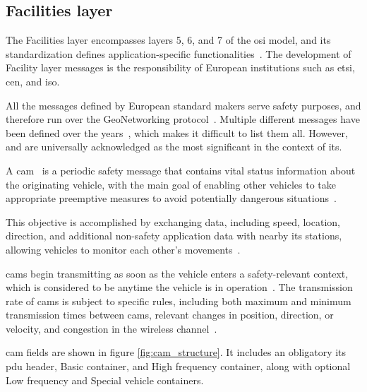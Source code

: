 \subsection[Facilities layer]{Facilities layer}
\label{subsec:Facilities}

The Facilities layer encompasses layers 5, 6, and 7 of the \gls{osi} model, and its standardization defines application-specific functionalities~\cite{festag_standards_2015}. The development of Facility layer messages is the responsibility of European institutions such as \gls{etsi}, \gls{cen}, and \gls{iso}.

All the messages defined by European standard makers serve safety purposes, and therefore run over the GeoNetworking protocol~\cite{festag_standards_2015}. Multiple different messages have been defined over the years~\cite{festag_cooperative_2014}, which makes it difficult to list them all. However,  and  are universally acknowledged as the most significant in the context of \gls{its}.

A \gls{cam}~\cite{etsi_intelligent_2019-2} is a periodic safety message that contains vital status information about the originating vehicle, with the main goal of enabling other vehicles to take appropriate preemptive measures to avoid potentially dangerous situations~\cite{al-sultan_comprehensive_2014}.

This objective is accomplished by exchanging data, including speed, location, direction, and additional non-safety application data with nearby \gls{its} stations, allowing vehicles to monitor each other's movements~\cite{festag_standards_2015}.

\glspl{cam} begin transmitting as soon as the vehicle enters a safety-relevant context, which is considered to be anytime the vehicle is in operation~\cite{festag_cooperative_2014}. The transmission rate of \glspl{cam} is subject to specific rules, including both maximum and minimum transmission times between \glspl{cam}, relevant changes in position, direction, or velocity, and congestion in the wireless channel~\cite{festag_cooperative_2014}.

\gls{cam} fields are shown in figure \ref{fig:cam_structure}. It includes an obligatory \gls{its} \gls{pdu} header, Basic container, and High frequency container, along with optional Low frequency and Special vehicle containers.

